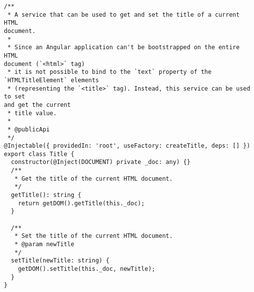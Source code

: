 \begin{verbatim}
/**
 * A service that can be used to get and set the title of a current HTML
document.
 *
 * Since an Angular application can't be bootstrapped on the entire HTML
document (`<html>` tag)
 * it is not possible to bind to the `text` property of the
`HTMLTitleElement` elements
 * (representing the `<title>` tag). Instead, this service can be used to set
and get the current
 * title value.
 *
 * @publicApi
 */
@Injectable({ providedIn: 'root', useFactory: createTitle, deps: [] })
export class Title {
  constructor(@Inject(DOCUMENT) private _doc: any) {}
  /**
   * Get the title of the current HTML document.
   */
  getTitle(): string {
    return getDOM().getTitle(this._doc);
  }

  /**
   * Set the title of the current HTML document.
   * @param newTitle
   */
  setTitle(newTitle: string) {
    getDOM().setTitle(this._doc, newTitle);
  }
}
\end{verbatim}
